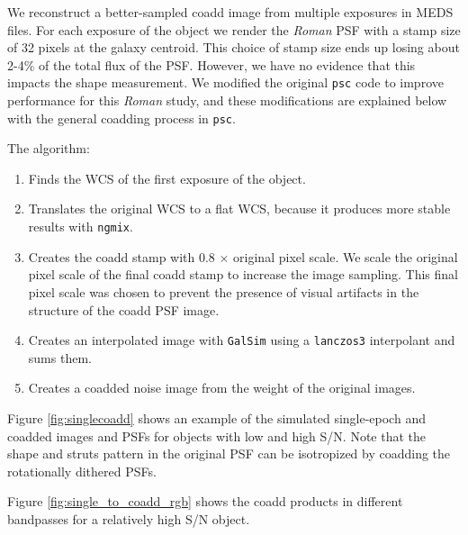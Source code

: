 \documentclass[fleqn,usenatbib]{mnras}
\begin{document}
We reconstruct a better-sampled coadd image from multiple exposures in MEDS files. For each exposure of the object we render the \emph{Roman} PSF with a stamp size of 32 pixels at the galaxy centroid. This choice of stamp size ends up losing about 2-4\% of the total flux of the PSF. However, we have no evidence that this impacts the shape measurement. We modified the original \texttt{psc} code to improve performance for this \emph{Roman} study, and these modifications are explained below with the general coadding process in \texttt{psc}. 

The algorithm: 
\begin{enumerate}
    \setlength\itemsep{1em}
    \item Finds the WCS of the first exposure of the object.
    \item Translates the original WCS to a flat WCS, because it produces more stable results with \texttt{ngmix}.
    \item Creates the coadd stamp with 0.8 $\times$ original pixel scale. We scale the original pixel scale of the final coadd stamp to increase the image sampling. This final pixel scale was chosen to prevent the presence of visual artifacts in the structure of the coadd PSF image. 
    \item Creates an interpolated image with \texttt{GalSim}  using a \texttt{lanczos3} interpolant and sums them. 
    \item Creates a coadded noise image from the weight of the original images. 
\end{enumerate}
Figure \ref{fig:singlecoadd} shows an example of the simulated single-epoch and coadded images and PSFs for objects with low and high S/N. Note that the shape and struts pattern in the original PSF can be isotropized by coadding the rotationally dithered PSFs. 


Figure \ref{fig:single_to_coadd_rgb} shows the coadd products in different bandpasses for a relatively high S/N object.


\end{document}
